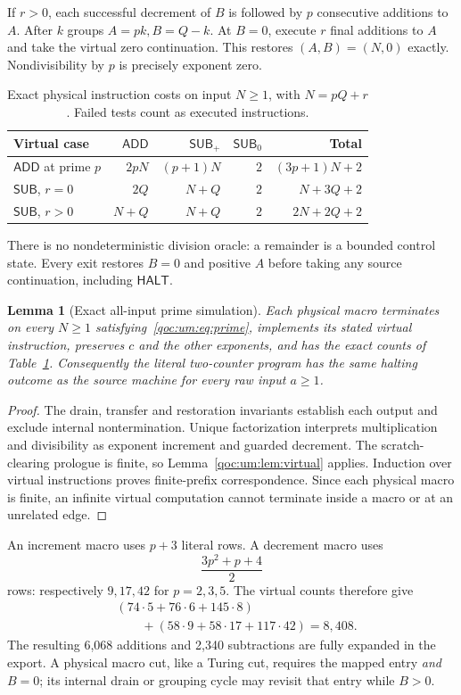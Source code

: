 \documentclass[11pt,letterpaper]{article}
\newtheorem{lemma}[theorem]{Lemma}
\theoremstyle{definition}
\theoremstyle{remark}
\newcommand{\HALT}{\mathsf{HALT}}
\newcommand{\ADD}{\mathsf{ADD}}
\newcommand{\SUB}{\mathsf{SUB}}
\begin{document}
If $r>0$, each successful decrement of $B$ is followed by $p$ consecutive additions to $A$. After $k$ groups $A=pk,B=Q-k$. At $B=0$, execute $r$ final additions to $A$ and take the virtual zero continuation. This restores $(A,B)=(N,0)$ exactly. Nondivisibility by $p$ is precisely exponent zero.

\begin{table}[ht]
\centering
\begin{tabular}{lrrrr}
\toprule
Virtual case & $\ADD$ & $\SUB_+$ & $\SUB_0$ & Total\\\midrule
$\ADD$ at prime $p$ & $2pN$ & $(p+1)N$ & $2$ & $(3p+1)N+2$\\
$\SUB$, $r=0$ & $2Q$ & $N+Q$ & $2$ & $N+3Q+2$\\
$\SUB$, $r>0$ & $N+Q$ & $N+Q$ & $2$ & $2N+2Q+2$\\\bottomrule
\end{tabular}
\caption{Exact physical instruction costs on input $N\geq1$, with $N=pQ+r$. Failed tests count as executed instructions.}\label{qoc:um:tab:cost}
\end{table}

There is no nondeterministic division oracle: a remainder is a bounded control state. Every exit restores $B=0$ and positive $A$ before taking any source continuation, including $\HALT$.

\begin{lemma}[Exact all-input prime simulation]\label{qoc:um:lem:prime}
Each physical macro terminates on every $N\geq1$ satisfying~\eqref{qoc:um:eq:prime}, implements its stated virtual instruction, preserves $c$ and the other exponents, and has the exact counts of Table~\ref{qoc:um:tab:cost}. Consequently the literal two-counter program has the same halting outcome as the source machine for every raw input $a\geq1$.
\end{lemma}
\begin{proof}
The drain, transfer and restoration invariants establish each output and exclude internal nontermination. Unique factorization interprets multiplication and divisibility as exponent increment and guarded decrement. The scratch-clearing prologue is finite, so Lemma~\ref{qoc:um:lem:virtual} applies. Induction over virtual instructions proves finite-prefix correspondence. Since each physical macro is finite, an infinite virtual computation cannot terminate inside a macro or at an unrelated edge.
\end{proof}

An increment macro uses $p+3$ literal rows. A decrement macro uses
\[
 \frac{3p^2+p+4}{2}
\]
rows: respectively $9,17,42$ for $p=2,3,5$. The virtual counts therefore give
\begin{align*}
 &(74\cdot5+76\cdot6+145\cdot8)\\
 &\qquad +(58\cdot9+58\cdot17+117\cdot42)=8{,}408.
\end{align*}
The resulting 6,068 additions and 2,340 subtractions are fully expanded in the export. A physical macro cut, like a Turing cut, requires the mapped entry \emph{and} $B=0$; its internal drain or grouping cycle may revisit that entry while $B>0$.
\end{document}
